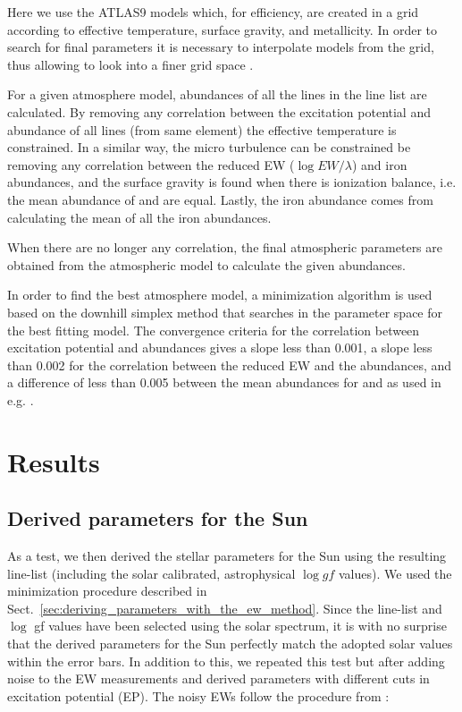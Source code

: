 \documentclass{aa}
\begin{document}
Here we use the ATLAS9 models which, for efficiency, are created
in a grid according to effective temperature, surface gravity, and
metallicity. In order to search for final parameters it is necessary to
interpolate models from the grid, thus allowing to look into a finer
grid space \citep[see e.g.][]{Sousa2014}.

For a given atmosphere model, abundances of all the lines in the line
list are calculated. By removing any correlation between the excitation
potential and abundance of all lines (from same element) the effective
temperature is constrained. In a similar way, the micro turbulence
can be constrained be removing any correlation between the reduced
EW ($\log EW/\lambda$) and iron abundances, and the surface gravity is found when
there is ionization balance, i.e. the mean abundance of 
and  are equal. Lastly, the iron abundance comes from
calculating the mean of all the iron abundances.

When there are no longer any correlation, the final atmospheric
parameters are obtained from the atmospheric model to calculate the
given abundances.

In order to find the best atmosphere model, a minimization algorithm
is used based on the downhill simplex method \citep{Press1992} that
searches in the parameter space for the best fitting model. The
convergence criteria for the correlation between excitation potential
and abundances gives a slope less than 0.001, a slope less than
0.002 for the correlation between the reduced EW and the abundances,
and a difference of less than 0.005 between the mean abundances for
 and  as used in e.g. \citet{Tsantaki2013,Sousa2008a}.







\section{Results}
\label{sec:results}


\subsection{Derived parameters for the Sun}
\label{sec:derived_parameters_of_the_sun}

As a test, we then derived the stellar parameters for the Sun using
the resulting line-list (including the solar calibrated, astrophysical
$\log \mathit{gf}$ values). We used the minimization procedure described
in Sect.~\ref{sec:deriving_parameters_with_the_ew_method}. Since the
line-list and $\log$ gf values have been selected using the solar
spectrum, it is with no surprise that the derived parameters for the
Sun perfectly match the adopted solar values within the error bars. In addition
to this, we
repeated this test but after adding noise to the EW measurements and
derived parameters with different cuts in excitation potential (EP). The
noisy EWs follow the procedure from \cite{Caryel1988}:
\end{document}
